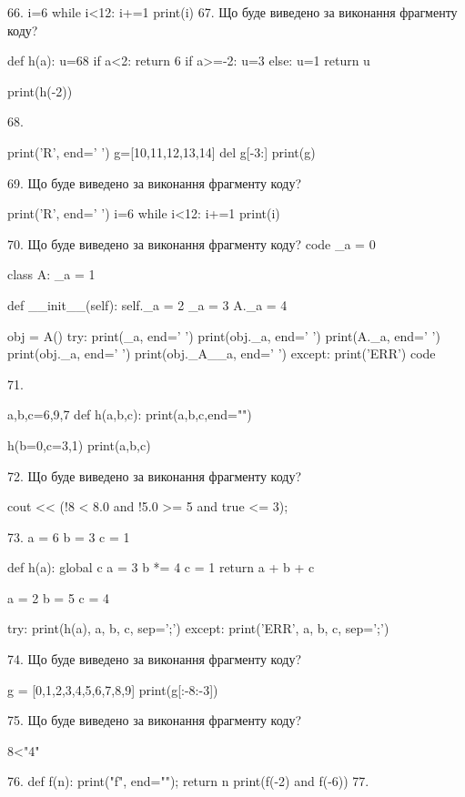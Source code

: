 \documentclass[11pt]{article}
\begin{document}
66. 
i=6
   while i<12: i+=1
   print(i)
67. Що буде виведено за виконання фрагменту коду?

def h(a):
    u=68
    if a<2: 
        return 6
    if a>=-2:
         u=3
    else:
         u=1
    return u

print(h(-2))

68. 

print('R', end=' ')
g=[10,11,12,13,14]
del g[-3:]
print(g)


69. Що буде виведено за виконання фрагменту коду?

print('R', end=' ')
i=6
while i<12:
    i+=1
print(i)


70. Що буде виведено за виконання фрагменту коду?
code
_a = 0

class A:
    _a = 1
    
    def __init__(self):
        self._a = 2
        _a = 3
        A._a = 4

obj = A()
try:
    print(_a, end=' ')
    print(obj._a, end=' ')
    print(A._a, end=' ')
    print(obj._a, end=' ')
    print(obj._A__a, end=' ')
except:
    print('ERR')
code

71. 

a,b,c=6,9,7
def h(a,b,c):
    print(a,b,c,end="")

h(b=0,c=3,1)
print(a,b,c)


72. Що буде виведено за виконання фрагменту коду?

cout << (!8 < 8.0 and !5.0 >= 5 and true <= 3);

73. 
a = 6
b = 3
c = 1

def h(a):
global c    a = 3
    b *= 4
    c = 1
    return a + b + c

a = 2
b = 5
c = 4

try:
    print(h(a), a, b, c, sep=';')
except:
    print('ERR', a, b, c, sep=';')

74. Що буде виведено за виконання фрагменту коду?

g = [0,1,2,3,4,5,6,7,8,9]
print(g[:-8:-3])


75. Що буде виведено за виконання фрагменту коду?

8<"4"

76. 
def f(n): print("f", end=""); return n
   print(f(-2) and f(-6))
77. 
\end{document}
